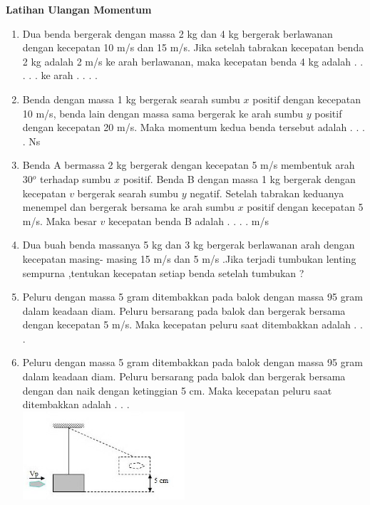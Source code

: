 \documentclass[10pt,a4paper]{extarticle}
\begin{document}
 \textbf{Latihan Ulangan Momentum} \phantom{ini nama siswa yang aaamengerjakan soal kuis ini }  

\begin{multicols*}{2}

\begin{enumerate}
\item Dua benda bergerak dengan massa 2 kg dan 4 kg bergerak berlawanan dengan kecepatan 10 m/s dan 15 m/s. Jika setelah tabrakan kecepatan benda 2 kg adalah 2 m/s ke arah berlawanan, maka kecepatan benda 4 kg adalah . . . . . ke arah . . . .
\vspace{3cm}

\item Benda dengan massa 1 kg bergerak searah sumbu $x$ positif dengan kecepatan 10 m/s, benda lain dengan massa sama bergerak ke arah sumbu $y$ positif dengan kecepatan 20 m/s. Maka momentum kedua benda tersebut adalah . .  . .  Ns
\vspace{3.5cm}


\item Benda A bermassa 2 kg bergerak dengan kecepatan 5 m/s membentuk arah 30$^o$ terhadap sumbu $x$ positif. Benda B dengan massa 1 kg bergerak dengan kecepatan $v$ bergerak searah sumbu $y$ negatif. Setelah tabrakan keduanya menempel dan bergerak bersama ke arah sumbu $x$ positif dengan kecepatan 5 m/s. Maka besar $v$ kecepatan benda B adalah . . . . m/s
\vspace{4cm}



\item Dua buah benda massanya 5 kg dan 3 kg bergerak berlawanan arah dengan kecepatan masing-   masing 15 m/s dan 5 m/s .Jika terjadi tumbukan lenting sempurna ,tentukan kecepatan setiap benda setelah tumbukan ?
\vspace{4.5cm}



\item Peluru dengan massa 5 gram ditembakkan pada balok dengan massa 95 gram dalam keadaan diam. Peluru bersarang pada balok dan bergerak bersama dengan kecepatan 5 m/s. Maka kecepatan peluru saat ditembakkan adalah . . .
\vspace{3cm}

\item Peluru dengan massa 5 gram ditembakkan pada balok dengan massa 95 gram dalam keadaan diam. Peluru bersarang pada balok dan bergerak bersama dengan dan naik dengan ketinggian 5 cm. Maka kecepatan peluru saat ditembakkan adalah . . .\\
\includegraphics[width=6cm]{pic/latul-mom1} 
\vspace{3cm}




\end{enumerate}
\end{multicols*}
\end{document}
